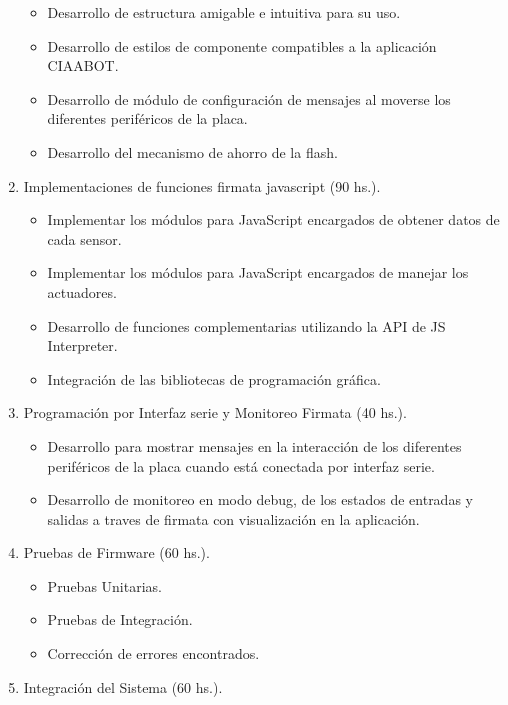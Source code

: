 \begin{enumerate}
	\begin{itemize}
		\item Desarrollo de estructura amigable e intuitiva para su uso.
		\item Desarrollo de estilos de componente compatibles a la aplicación CIAABOT.
		\item Desarrollo de módulo de configuración de mensajes al moverse los diferentes periféricos de la placa.
		\item Desarrollo del mecanismo de ahorro de la flash.
	\end{itemize}
	
	\item Implementaciones de funciones firmata javascript (90 hs.).
	
	\begin{itemize}
		\item Implementar los módulos para JavaScript encargados de obtener datos de cada sensor.
		\item Implementar los módulos para JavaScript encargados de manejar los actuadores.
		\item Desarrollo de funciones complementarias utilizando la API de JS Interpreter.
		\item Integración de las bibliotecas de programación gráfica.
	\end{itemize}

	\item Programación por Interfaz serie y Monitoreo Firmata (40 hs.).
	
	\begin{itemize}
		\item Desarrollo para mostrar mensajes en la interacción de los diferentes periféricos de la placa cuando está conectada por interfaz serie.
		\item Desarrollo de monitoreo en modo debug, de los estados de entradas y salidas a traves de firmata con visualización en la aplicación.
	\end{itemize}

	\item Pruebas de Firmware (60 hs.).
	
	\begin{itemize}
		\item Pruebas Unitarias.
		\item Pruebas de Integración.
		\item Corrección de errores encontrados.
	\end{itemize}

	\item Integración del Sistema (60 hs.).
	

\end{enumerate}
